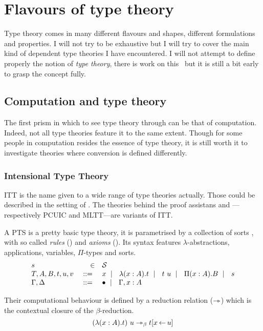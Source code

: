 \chapter{Flavours of type theory}

Type theory comes in many different flavours and shapes, different formulations
and properties. I will not try to be exhaustive but I will try to cover the
main kind of dependent type theories I have encountered.
I will not attempt to define properly the notion of \emph{type theory},
there is work on this~\misref{} but it is still a bit early to grasp the
concept fully.

\section{Computation and type theory}

The first prism in which to see type theory through can be that of computation.
Indeed, not all type theories feature it to the same extent. Though for some
people in computation resides the essence of type theory, it is still worth
it to investigate theories where conversion is defined differently.

\subsection{Intensional Type Theory}

\acrfull{ITT} is the name given to a wide range of type theories actually.
Those could be described in the setting of .
The theories behind the proof assistans \Coq and \Agda---respectively
\acrfull{PCUIC} and \acrfull{MLTT}---are variants of \acrshort{ITT}.

A \acrshort{PTS} is a pretty basic type theory, it is parametrised by a
collection of sorts \cS, with so called \emph{rules}
(\Rl) and \emph{axioms} (\Ax).
Its syntax features \(\lambda\)-abstractions, applications, variables,
\(\Pi\)-types and sorts.
%
\[
  \begin{array}{lrl}
    s &\in& \mathcal{S} \\
    T,A,B,t,u,v &\ \mathrel{{:}{:}{=}}\ & x \ \mid\ \  \lambda (x:A). t \ \mid\ \  t\ u
    \ \mid\ \  \Pi (x : A). B \ \mid\ \  s \\
    \Gamma, \Delta &\ \mathrel{{:}{:}{=}}\ & \bullet \ \mid\ \  \Gamma, x:A
  \end{array}
\]

Their computational behaviour is defined by a reduction relation (\(\rightarrowtriangle\))
which is the contextual closure of the \(\beta\)-reduction.
\[
  (\lambda (x:A). t)\ u \rightarrowtriangle_\beta t[x \mathop{\leftarrow} u]
\]

